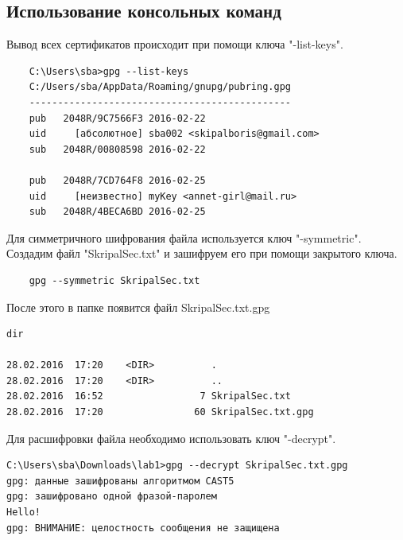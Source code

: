 \documentclass[10pt,a4paper]{report}
\begin{document}
\subsection{Использование консольных команд}
Вывод всех сертификатов происходит при помощи ключа  "\--list-keys".
\begin{verbatim}
	C:\Users\sba>gpg --list-keys
	C:/Users/sba/AppData/Roaming/gnupg/pubring.gpg
	----------------------------------------------
	pub   2048R/9C7566F3 2016-02-22
	uid     [абсолютное] sba002 <skipalboris@gmail.com>
	sub   2048R/00808598 2016-02-22
	
	pub   2048R/7CD764F8 2016-02-25
	uid     [неизвестно] myKey <annet-girl@mail.ru>
	sub   2048R/4BECA6BD 2016-02-25
\end{verbatim}

Для симметричного шифрования файла используется ключ "\--symmetric". Создадим файл "SkripalSec.txt" и зашифруем его при помощи закрытого ключа.

\begin{verbatim}
	gpg --symmetric SkripalSec.txt
\end{verbatim}

После этого в папке появится файл SkripalSec.txt.gpg

\begin{verbatim}
dir

28.02.2016  17:20    <DIR>          .
28.02.2016  17:20    <DIR>          ..
28.02.2016  16:52                 7 SkripalSec.txt
28.02.2016  17:20                60 SkripalSec.txt.gpg
\end{verbatim}

Для расшифровки файла необходимо использовать ключ "\--decrypt".

\begin{verbatim}
C:\Users\sba\Downloads\lab1>gpg --decrypt SkripalSec.txt.gpg
gpg: данные зашифрованы алгоритмом CAST5
gpg: зашифровано одной фразой-паролем
Hello!
gpg: ВНИМАНИЕ: целостность сообщения не защищена
\end{verbatim}
	
\end{document}
